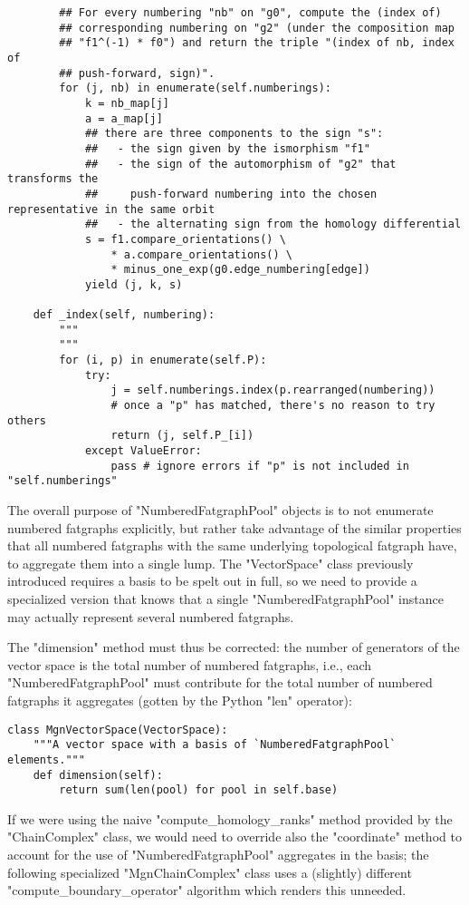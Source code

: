 \begin{lstlisting}
        ## For every numbering "nb" on "g0", compute the (index of)
        ## corresponding numbering on "g2" (under the composition map
        ## "f1^(-1) * f0") and return the triple "(index of nb, index of
        ## push-forward, sign)".
        for (j, nb) in enumerate(self.numberings):
            k = nb_map[j]
            a = a_map[j]
            ## there are three components to the sign "s":
            ##   - the sign given by the ismorphism "f1"
            ##   - the sign of the automorphism of "g2" that transforms the
            ##     push-forward numbering into the chosen representative in the same orbit
            ##   - the alternating sign from the homology differential
            s = f1.compare_orientations() \
                * a.compare_orientations() \
                * minus_one_exp(g0.edge_numbering[edge])
            yield (j, k, s)

    def _index(self, numbering):
        """
        """
        for (i, p) in enumerate(self.P):
            try:
                j = self.numberings.index(p.rearranged(numbering))
                # once a "p" has matched, there's no reason to try others
                return (j, self.P_[i])
            except ValueError:
                pass # ignore errors if "p" is not included in "self.numberings"
\end{lstlisting}

The overall purpose of "NumberedFatgraphPool" objects is to not
enumerate numbered fatgraphs explicitly, but rather take advantage of
the similar properties that all numbered fatgraphs with the same
underlying topological fatgraph have, to aggregate them into a single
lump.   The "VectorSpace" class previously introduced requires a basis
to be spelt out in full, so we need to provide a specialized version
that knows that a single "NumberedFatgraphPool" instance may actually
represent several numbered fatgraphs.  

The "dimension" method must thus be corrected: the number of
generators of the vector space is the total number of numbered
fatgraphs, i.e., each "NumberedFatgraphPool" must contribute for the
total number of numbered fatgraphs it aggregates (gotten by the Python
"len" operator):
\begin{lstlisting}
class MgnVectorSpace(VectorSpace):
    """A vector space with a basis of `NumberedFatgraphPool` elements."""
    def dimension(self):
        return sum(len(pool) for pool in self.base)

\end{lstlisting}
If we were using the naive "compute_homology_ranks" method provided by
the "ChainComplex" class, we would need to override also the
"coordinate" method to account for the use of "NumberedFatgraphPool"
aggregates in the basis; the following specialized "MgnChainComplex"
class uses a (slightly) different "compute_boundary_operator"
algorithm which renders this unneeded.

